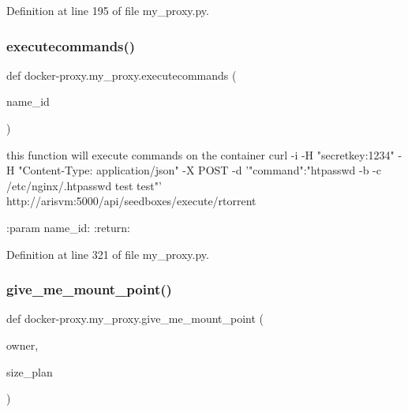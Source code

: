 Definition at line 195 of file my\+\_\+proxy.\+py.

\hypertarget{namespacedocker-proxy_1_1my__proxy_abf1a0936dc4dd14a5aaa78854c6583ce}{}\label{namespacedocker-proxy_1_1my__proxy_abf1a0936dc4dd14a5aaa78854c6583ce} 
\subsubsection{\texorpdfstring{executecommands()}{executecommands()}}
{\footnotesize\ttfamily def docker-\/proxy.\+my\+\_\+proxy.\+executecommands (\begin{DoxyParamCaption}\item[{}]{name\+\_\+id }\end{DoxyParamCaption})}

\begin{DoxyVerb}this function will execute commands on the container
curl -i -H "secretkey:1234" -H "Content-Type: application/json" -X POST -d
'{"command":"htpasswd -b -c /etc/nginx/.htpasswd test test"}' http://arisvm:5000/api/seedboxes/execute/rtorrent

:param name_id:
:return:
\end{DoxyVerb}
 

Definition at line 321 of file my\+\_\+proxy.\+py.

\hypertarget{namespacedocker-proxy_1_1my__proxy_a32ea0c997fb4530822b84a6861f9666c}{}\label{namespacedocker-proxy_1_1my__proxy_a32ea0c997fb4530822b84a6861f9666c} 
\subsubsection{\texorpdfstring{give\+\_\+me\+\_\+mount\+\_\+point()}{give\_me\_mount\_point()}}
{\footnotesize\ttfamily def docker-\/proxy.\+my\+\_\+proxy.\+give\+\_\+me\+\_\+mount\+\_\+point (\begin{DoxyParamCaption}\item[{}]{owner,  }\item[{}]{size\+\_\+plan }\end{DoxyParamCaption})}

